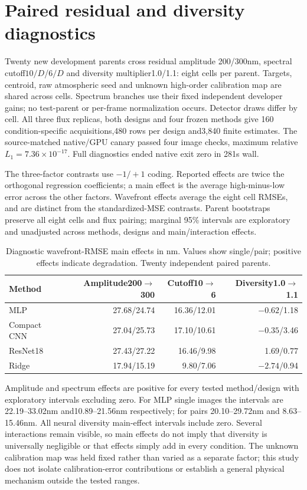 \documentclass[11pt,a4paper]{article}
\begin{document}
\section{Paired residual and diversity diagnostics}
Twenty new development parents cross residual amplitude 200/300nm, spectral
cutoff$10/D$/$6/D$ and diversity multiplier1.0/1.1: eight cells per parent.
Targets, centroid, raw atmospheric seed and unknown high-order calibration map
are shared across cells. Spectrum branches use their fixed independent developer
gains; no test-parent or per-frame normalization occurs. Detector draws differ
by cell. All three flux replicas, both designs and four frozen methods give
160 condition-specific acquisitions,480 rows per design and3,840 finite estimates.
The source-matched native/GPU canary passed four image checks, maximum relative
$L_1=7.36\times10^{-17}$. Full diagnostics ended native exit zero in 281s wall.

The three-factor contrasts use $-1/+1$ coding. Reported effects are twice the
orthogonal regression coefficients; a main effect is the average high-minus-low
error across the other factors. Wavefront effects average the eight cell RMSEs,
and are distinct from the standardized-MSE contrasts. Parent bootstraps preserve
all eight cells and flux pairing; marginal 95\% intervals are exploratory and
unadjusted across methods, designs and main/interaction effects.

\begin{table}[ht]
\centering\small
\caption{Diagnostic wavefront-RMSE main effects in nm. Values show single/pair;
positive effects indicate degradation. Twenty independent paired parents.}
\begin{tabular}{@{}lrrr@{}}
\toprule
Method&Amplitude200$\to$300&Cutoff10$\to$6&Diversity1.0$\to$1.1\\
\midrule
MLP&27.68/24.74&16.36/12.01&$-0.62$/1.18\\
Compact CNN&27.04/25.73&17.10/10.61&$-0.35$/3.46\\
ResNet18&27.43/27.22&16.46/9.98&1.69/0.77\\
Ridge&17.94/15.19&9.80/7.06&$-2.74$/0.94\\
\bottomrule
\end{tabular}
\label{tab:factors}
\end{table}

Amplitude and spectrum effects are positive for every tested method/design
with exploratory intervals excluding zero. For MLP single images the intervals
are 22.19--33.02nm and10.89--21.56nm respectively; for pairs 20.10--29.72nm and
8.63--15.46nm. All neural diversity main-effect intervals include zero.
Several interactions remain visible, so main effects do not imply that diversity
is universally negligible or that effects simply add in every condition.
The unknown calibration map was held fixed rather than varied as a separate
factor; this study does not isolate calibration-error contributions or establish
a general physical mechanism outside the tested ranges.
\end{document}
